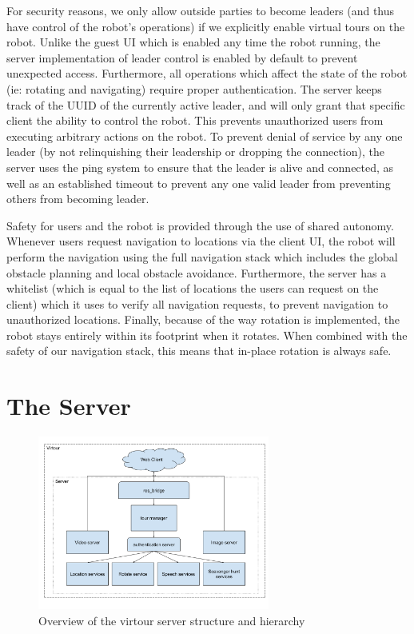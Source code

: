 \documentclass[
  oneside,
  11pt, a4paper,
  footinclude=true,
  headinclude=true,
  cleardoublepage=empty
]{article}
\begin{document}
For security reasons, we only allow outside parties to become leaders (and thus
have control of the robot's operations) if we explicitly enable virtual tours
on the robot. Unlike the guest UI which is enabled any time the robot running,
the server implementation of leader control is enabled by default to prevent
unexpected access. Furthermore, all operations which affect the state of the
robot (ie: rotating and navigating) require proper authentication. The server
keeps track of the UUID of the currently active leader, and will only grant
that specific client the ability to control the robot. This prevents
unauthorized users from executing arbitrary actions on the robot. To prevent
denial of service by any one leader (by not relinquishing their leadership or
dropping the connection), the server uses the ping system to ensure that the
leader is alive and connected, as well as an established timeout to prevent any
one valid leader from preventing others from becoming leader.

Safety for users and the robot is provided through the use of shared autonomy.
Whenever users request navigation to locations via the client UI, the robot
will perform the navigation using the full navigation stack which includes the
global obstacle planning and local obstacle avoidance. Furthermore, the server
has a whitelist (which is equal to the list of locations the users can request
on the client) which it uses to verify all navigation requests, to prevent
navigation to unauthorized locations. Finally, because of the way rotation is
implemented, the robot stays entirely within its footprint when it rotates.
When combined with the safety of our navigation stack, this means that in-place
rotation is always safe.


\section{The Server}

\begin{figure}
\centering
\includegraphics[width=3in]{virtour_server}
\caption{Overview of the virtour server structure and hierarchy}
\end{figure}
\end{document}
